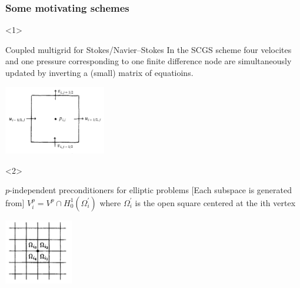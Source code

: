 \documentclass[presentation,aspectratio=43,10pt]{beamer}
\begin{document}
\begin{frame}
  \frametitle{Some motivating schemes}

  \begin{onlyenv}<1>
    \begin{block}{Coupled multigrid for Stokes/Navier--Stokes}
      In the SCGS scheme four velocites and one pressure
      corresponding to one finite difference node are simultaneously
      updated by inverting a (small) matrix of equatioins.

      \begin{center}
        \includegraphics[height=3cm]{vanka}
      \end{center}
      \begin{flushright}
        \textcite{Vanka:1986} \hspace{4em}
      \end{flushright}
    \end{block}
  \end{onlyenv}
  \begin{onlyenv}<2>
    \begin{block}{$p$-independent preconditioners for elliptic problems}
      [Each subspace is generated from]
      $V_i^p = V^p \cap H^1_0(\Omega_i^{'})$ where $\Omega_i^{'}$ is the open square
      centered at the ith vertex
      \begin{center}
        \includegraphics[width=3cm]{pavarino}
      \end{center}
      \begin{flushright}
        \textcite{Pavarino:1993} \hspace{4em}
      \end{flushright}
    \end{block}
  \end{onlyenv}


\end{frame}
\end{document}
